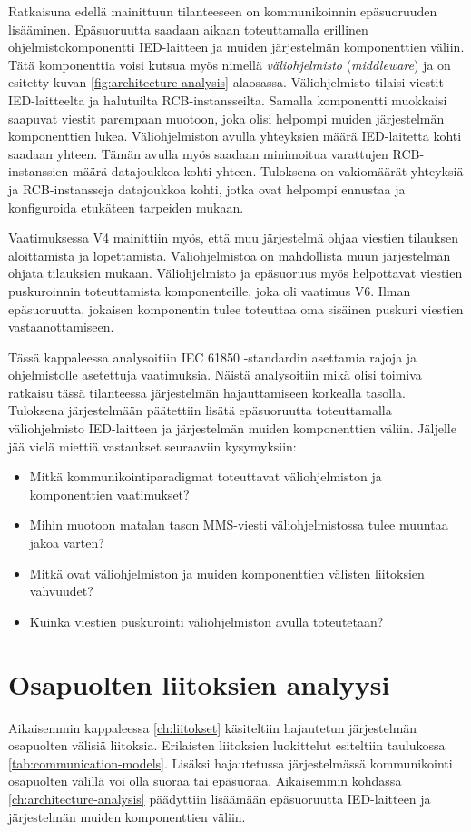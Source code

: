 Ratkaisuna edellä mainittuun tilanteeseen on kommunikoinnin epäsuoruuden lisääminen. Epäsuoruutta saadaan aikaan toteuttamalla erillinen ohjelmistokomponentti IED-laitteen ja muiden järjestelmän komponenttien väliin. Tätä komponenttia voisi kutsua myös nimellä \emph{väliohjelmisto} (\emph{middleware}) ja on esitetty kuvan \ref{fig:architecture-analysis} alaosassa. Väliohjelmisto tilaisi viestit IED-laitteelta ja halutuilta RCB-instansseilta. Samalla komponentti muokkaisi saapuvat viestit parempaan muotoon, joka olisi helpompi muiden järjestelmän komponenttien lukea. Väliohjelmiston avulla yhteyksien määrä IED-laitetta kohti saadaan yhteen. Tämän avulla myös saadaan minimoitua varattujen RCB-instanssien määrä datajoukkoa kohti yhteen. Tuloksena on vakiomäärät yhteyksiä ja RCB-instansseja datajoukkoa kohti, jotka ovat helpompi ennustaa ja konfiguroida etukäteen tarpeiden mukaan.

Vaatimuksessa V4 mainittiin myös, että muu järjestelmä ohjaa viestien tilauksen aloittamista ja lopettamista. Väliohjelmistoa on mahdollista muun järjestelmän ohjata tilauksien mukaan. Väliohjelmisto ja epäsuoruus myös helpottavat viestien puskuroinnin toteuttamista komponenteille, joka oli vaatimus V6. Ilman epäsuoruutta, jokaisen komponentin tulee toteuttaa oma sisäinen puskuri viestien vastaanottamiseen.

Tässä kappaleessa analysoitiin IEC 61850 -standardin asettamia rajoja ja ohjelmistolle asetettuja vaatimuksia. Näistä analysoitiin mikä olisi toimiva ratkaisu tässä tilanteessa järjestelmän hajauttamiseen korkealla tasolla. Tuloksena järjestelmään päätettiin lisätä epäsuoruutta toteuttamalla väliohjelmisto IED-laitteen ja järjestelmän muiden komponenttien väliin. Jäljelle jää vielä miettiä vastaukset seuraaviin kysymyksiin:
\begin{itemize}
	\item Mitkä kommunikointiparadigmat toteuttavat väliohjelmiston ja komponenttien vaatimukset?
	\item Mihin muotoon matalan tason MMS-viesti väliohjelmistossa tulee muuntaa jakoa varten?
	\item Mitkä ovat väliohjelmiston ja muiden komponenttien välisten liitoksien vahvuudet?
	\item Kuinka viestien puskurointi väliohjelmiston avulla toteutetaan?
\end{itemize}


\section{Osapuolten liitoksien analyysi}
Aikaisemmin kappaleessa \ref{ch:liitokset} käsiteltiin hajautetun järjestelmän osapuolten välisiä liitoksia. Erilaisten liitoksien luokittelut esiteltiin taulukossa \ref{tab:communication-models}. Lisäksi hajautetussa järjestelmässä kommunikointi osapuolten välillä voi olla suoraa tai epäsuoraa. Aikaisemmin kohdassa \ref{ch:architecture-analysis} päädyttiin lisäämään epäsuoruutta IED-laitteen ja järjestelmän muiden komponenttien väliin.


